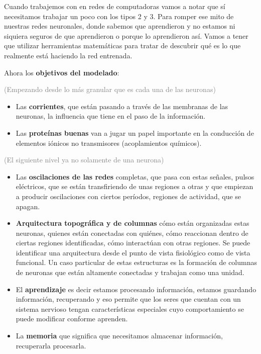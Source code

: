 Cuando trabajemos con en redes de computadoras vamos a notar que sí necesitamos trabajar un poco con los tipos 2 y 3. Para romper ese mito de nuestras redes neuronales, donde sabemos que aprendieron y no estamos ni siquiera seguros de que aprendieron o porque lo aprendieron así. Vamos a tener que utilizar herramientas matemáticas para tratar de descubrir qué es lo que realmente está haciendo la red entrenada. 


Ahora los \textbf{objetivos del modelado}:

\textcolor{gray}{(Empezando desde lo más granular que es cada una de las neuronas)}

\begin{itemize}
 \item Las \textbf{corrientes}, que están pasando a través de las membranas de las neuronas, la influencia que tiene en el paso de la información. 
 \item Las \textbf{proteínas buenas} van a jugar un papel importante en la conducción de elementos iónicos no transmisores (acoplamientos químicos).
\end{itemize}

\textcolor{gray}{(El siguiente nivel ya no solamente de una neurona)}

\begin{itemize}
 \item Las \textbf{oscilaciones de las redes} completas, que pasa con estas señales, pulsos eléctricos, que se están transfiriendo de unas regiones a otras y que empiezan a producir oscilaciones con ciertos períodos,  regiones de actividad, que se apagan.
 \item \textbf{Arquitectura topográfica y de columnas} cómo están organizadas estas neuronas, quienes están conectadas con quiénes, cómo reaccionan dentro de ciertas regiones identificadas, cómo interactúan con otras regiones. Se puede identificar una arquitectura desde el punto de vista fisiológico como de vista funcional. Un caso particular de estas estructuras es la formación de columnas de neuronas que están altamente conectadas y trabajan como una unidad.
 \item El \textbf{aprendizaje} es decir estamos procesando información, estamos guardando información, recuperando y eso permite que los seres que cuentan con un sistema nervioso tengan características especiales cuyo comportamiento se puede modificar conforme aprenden. 
 \item La \textbf{memoria} que significa que necesitamos almacenar información, recuperarla procesarla. 
\end{itemize}



